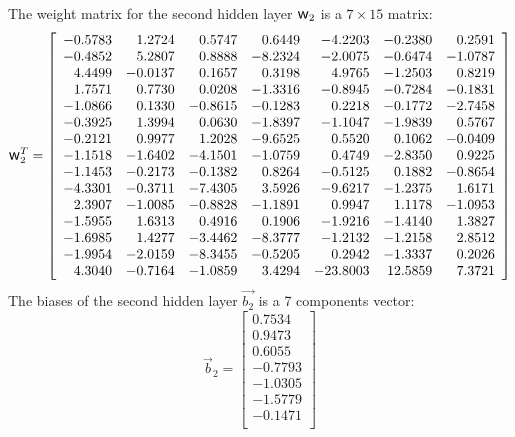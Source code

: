 \documentclass[twoside,english,1p,final,sort&compress]{elsarticle}
\theoremstyle{plain}
\DeclareRobustCommand{\w}{\mbox{\large\ensuremath{\mathsf{w}}}}
\begin{document}
The weight matrix for the second hidden layer $\w_2$ is a $7\times15$ matrix:
\begin{equation*}
\w_2^T = \left[
\begin{array}{rrrrrrr}
-0.5783 & 1.2724 & 0.5747 & 0.6449 & -4.2203 & -0.2380 & 0.2591\\
-0.4852 & 5.2807 & 0.8888 & -8.2324 & -2.0075 & -0.6474 & -1.0787\\
4.4499 & -0.0137 & 0.1657 & 0.3198 & 4.9765 & -1.2503 & 0.8219\\
1.7571 & 0.7730 & 0.0208 & -1.3316 & -0.8945 & -0.7284 & -0.1831\\
-1.0866 & 0.1330 & -0.8615 & -0.1283 & 0.2218 & -0.1772 & -2.7458\\
-0.3925 & 1.3994 & 0.0630 & -1.8397 & -1.1047 & -1.9839 & 0.5767\\
-0.2121 & 0.9977 & 1.2028 & -9.6525 & 0.5520 & 0.1062 & -0.0409\\
-1.1518 & -1.6402 & -4.1501 & -1.0759 & 0.4749 & -2.8350 & 0.9225\\
-1.1453 & -0.2173 & -0.1382 & 0.8264 & -0.5125 & 0.1882 & -0.8654\\
-4.3301 & -0.3711 & -7.4305 & 3.5926 & -9.6217 & -1.2375 & 1.6171\\
2.3907 & -1.0085 & -0.8828 & -1.1891 & 0.9947 & 1.1178 & -1.0953\\
-1.5955 & 1.6313 & 0.4916 & 0.1906 & -1.9216 & -1.4140 & 1.3827\\
-1.6985 & 1.4277 & -3.4462 & -8.3777 & -1.2132 & -1.2158 & 2.8512\\
-1.9954 & -2.0159 & -8.3455 & -0.5205 & 0.2942 & -1.3337 & 0.2026\\
4.3040 & -0.7164 & -1.0859 & 3.4294 & -23.8003 & 12.5859 & 7.3721\\
\end{array}\right]
\end{equation*}
The biases of the second hidden layer $\overrightarrow{b_2}$ is a 7 components vector:
\begin{equation*}
\overrightarrow{b}_2 = \left[
\begin{array}{r}
0.7534\\
0.9473\\
0.6055\\
-0.7793\\
-1.0305\\
-1.5779\\
-0.1471\\
\end{array}\right]
\end{equation*}
\end{document}

